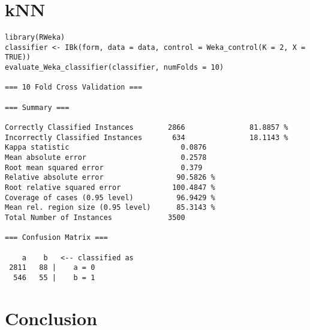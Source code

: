 \documentclass[11pt,a4paper]{article}
\begin{document}
\section{kNN}
\label{sec-4}
\begin{verbatim}
library(RWeka)
classifier <- IBk(form, data = data, control = Weka_control(K = 2, X = TRUE))
evaluate_Weka_classifier(classifier, numFolds = 10)

=== 10 Fold Cross Validation ===

=== Summary ===

Correctly Classified Instances        2866               81.8857 %
Incorrectly Classified Instances       634               18.1143 %
Kappa statistic                          0.0876
Mean absolute error                      0.2578
Root mean squared error                  0.379 
Relative absolute error                 90.5826 %
Root relative squared error            100.4847 %
Coverage of cases (0.95 level)          96.9429 %
Mean rel. region size (0.95 level)      85.3143 %
Total Number of Instances             3500     

=== Confusion Matrix ===

    a    b   <-- classified as
 2811   88 |    a = 0
  546   55 |    b = 1
\end{verbatim}

\section{Conclusion}
\label{sec-5}
\end{document}
